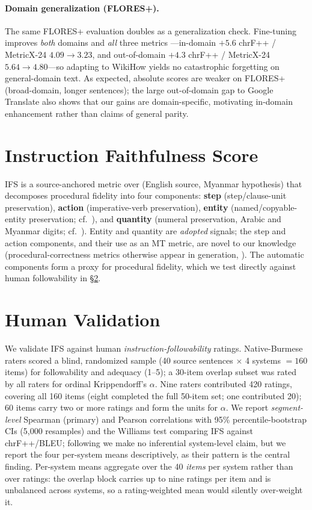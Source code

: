 \documentclass[11pt]{article}
\begin{document}
\paragraph{Domain generalization (FLORES+).} The same FLORES+ evaluation doubles as a
generalization check. Fine-tuning improves \emph{both} domains and \emph{all} three metrics
---in-domain $+5.6$ chrF++ / MetricX-24 $4.09\rightarrow3.23$, and out-of-domain $+4.3$ chrF++
/ MetricX-24 $5.64\rightarrow4.80$---so adapting to WikiHow yields no catastrophic forgetting
on general-domain text. As expected, absolute scores are weaker on FLORES+ (broad-domain,
longer sentences); the large out-of-domain gap to Google Translate also shows that our gains
are domain-specific, motivating in-domain enhancement rather than claims of general parity.



\section{Instruction Faithfulness Score}\label{sec:ifs}
IFS is a source-anchored metric over (English source, Myanmar hypothesis) that decomposes
procedural fidelity into four components: \textbf{step} (step/clause-unit preservation),
\textbf{action} (imperative-verb preservation), \textbf{entity} (named/copyable-entity
preservation; cf.\ \citealp{meta2024,wmtced2022}), and \textbf{quantity} (numeral
preservation, Arabic and Myanmar digits; cf.\ \citealp{wmtced2022}). Entity and quantity are
\emph{adopted} signals; the step and action components, and their use as an MT metric, are
novel to our knowledge (procedural-correctness metrics otherwise appear in generation,
\citealp{recipegen2025}). The automatic components form a proxy for procedural fidelity, which we
test directly against human followability in \S\ref{sec:human}.


\section{Human Validation}\label{sec:human}
We validate IFS against human \emph{instruction-followability} ratings. Native-Burmese raters
scored a blind, randomized sample (40 source sentences $\times$ 4 systems $=160$ items) for
followability and adequacy (1--5); a 30-item overlap subset was rated by all raters for
ordinal Krippendorff's $\alpha$. Nine raters contributed 420 ratings, covering all 160 items
(eight completed the full 50-item set; one contributed 20); 60 items carry two or more ratings
and form the units for $\alpha$. We report \emph{segment-level} Spearman (primary) and
Pearson correlations with 95\% percentile-bootstrap CIs (5{,}000 resamples) and the Williams
test \citep{graham2014williams} comparing IFS against chrF++/BLEU; following
\citet{mathur2020tangled,kocmi2021ship} we make no inferential system-level claim, but we report
the four per-system means descriptively, as their pattern is the central finding. Per-system
means aggregate over the 40 \emph{items} per system rather than over ratings: the overlap block
carries up to nine ratings per item and is unbalanced across systems, so a rating-weighted mean
would silently over-weight it.
\end{document}

